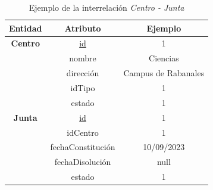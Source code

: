 \begin{itemize}
    \begin{table}[H]
    \centering
        \begin{tabular}{ | c | c | c |  }
             \hline
                 \textbf{Entidad} & \textbf{Atributo} & \textbf{Ejemplo}\\       
             \hline
                 \textbf{Centro}  & \underline{id} & 1\\
                  & nombre & Ciencias\\
                  & dirección & Campus de Rabanales\\
                  & idTipo & 1\\
                  & estado & 1\\
             \hline
                 \textbf{Junta}  & \underline{id} & 1\\
                  & idCentro & 1\\
                  & fechaConstitución & 10/09/2023\\
                  & fechaDisolución & null\\
                  & estado & 1\\
        \end{tabular}
        \caption{Ejemplo de la interrelación \textit{Centro - Junta}}
        \label{table:I-Ct-Ju}
    \end{table}
\end{itemize}

